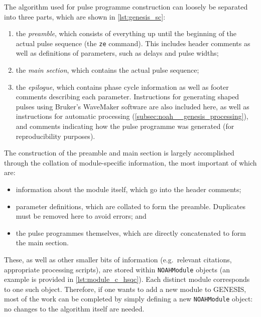 The algorithm used for pulse programme construction can loosely be separated into three parts, which are shown in \cref{lst:genesis_sc}:
\begin{enumerate}
    \item the \textit{preamble}, which consists of everything up until the beginning of the actual pulse sequence (the \texttt{ze} command). This includes header comments as well as definitions of parameters, such as delays and pulse widths;
    \item the \textit{main section}, which contains the actual pulse sequence;
    \item the \textit{epilogue}, which contains phase cycle information as well as footer comments describing each parameter. Instructions for generating shaped pulses using Bruker's WaveMaker software are also included here, as well as instructions for automatic processing (\cref{subsec:noah__genesis_processing}), and comments indicating how the pulse programme was generated (for reproducibility purposes).
\end{enumerate}


The construction of the preamble and main section is largely accomplished through the collation of module-specific information, the most important of which are:
\begin{itemize}
    \item information about the module itself, which go into the header comments;
    \item parameter definitions, which are collated to form the preamble. Duplicates must be removed here to avoid errors; and
    \item the pulse programmes themselves, which are directly concatenated to form the main section.
\end{itemize}
These, as well as other smaller bits of information (e.g.\ relevant citations, appropriate processing scripts), are stored within \texttt{NOAHModule} objects (an example is provided in \cref{lst:module_c_hsqc}).
Each distinct module corresponds to one such object.
Therefore, if one wants to add a new module to GENESIS, most of the work can be completed by simply defining a new \texttt{NOAHModule} object: no changes to the algorithm itself are needed.

